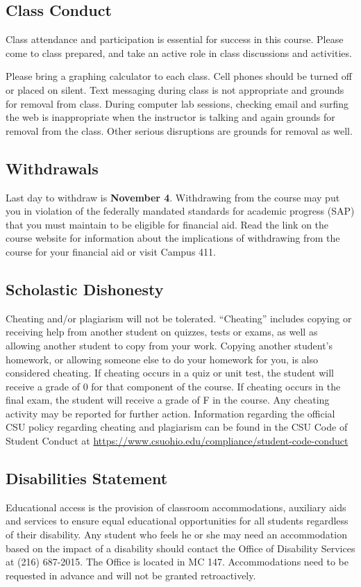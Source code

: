 \documentclass[12pt]{article}
\begin{document}
\subsection{Class Conduct}
Class attendance and participation is essential for success in this course. Please come to class prepared,
and take an active role in class discussions and activities.

Please bring a graphing calculator to each class.  Cell phones should be turned off or placed on silent.
Text messaging during class is not appropriate and grounds for removal from class.  During computer lab 
sessions, checking email and surfing the web is inappropriate when the instructor is talking and again 
grounds for removal from the class.  Other serious disruptions are grounds for removal as well.

\subsection{Withdrawals}
Last day to withdraw is \textbf{November 4}. Withdrawing from the course may put you in violation
of the federally mandated standards for academic progress (SAP) that you must maintain to be eligible for 
financial aid.  Read the link on the course website for information about the implications of withdrawing 
from the course for your financial aid or visit Campus 411.

\subsection{Scholastic Dishonesty}
Cheating and/or plagiarism will not be tolerated. ``Cheating'' includes copying or receiving help from
another student on quizzes, tests or exams, as well as allowing another student to copy from your work. 
Copying another student's homework, or allowing someone else to do your homework for you, is also 
considered cheating. If cheating occurs in a quiz or unit test, the student will receive a grade of 0 for 
that component of the course. If cheating occurs in the final exam, the student will receive a grade of F in 
the course. Any cheating activity may be reported for further action.  Information regarding the official
CSU policy regarding cheating and plagiarism can be found in the  CSU Code of Student Conduct at 
\url{https://www.csuohio.edu/compliance/student-code-conduct}

\subsection{Disabilities Statement} 
Educational access is the provision of classroom accommodations, auxiliary aids and services to ensure 
equal educational opportunities for all students regardless of their disability. Any student who feels 
he or she may need an accommodation based on the impact of a disability should contact the Office of 
Disability Services at (216) 687-2015. The Office is located in MC 147. Accommodations need to be 
requested in advance and will not be granted retroactively.
\end{document}
